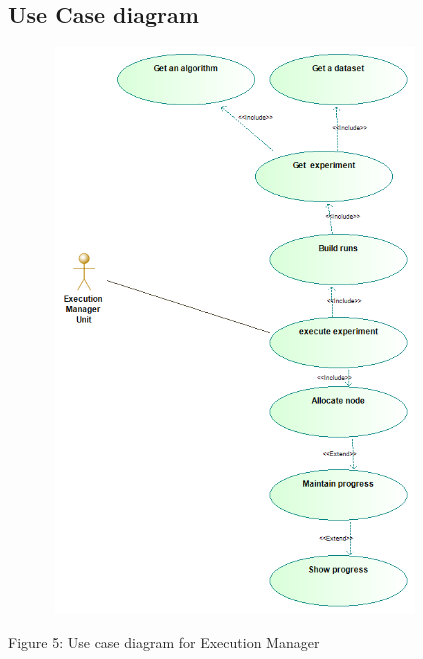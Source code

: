 \subsection{Use Case diagram}
    \includegraphics[width=12cm,height=15cm,keepaspectratio]{execution_manager/images/execution_manager_use_case_diagram.png}
    \begin{center}
    	\small{Figure 5: Use case diagram for Execution Manager}
    \end{center}